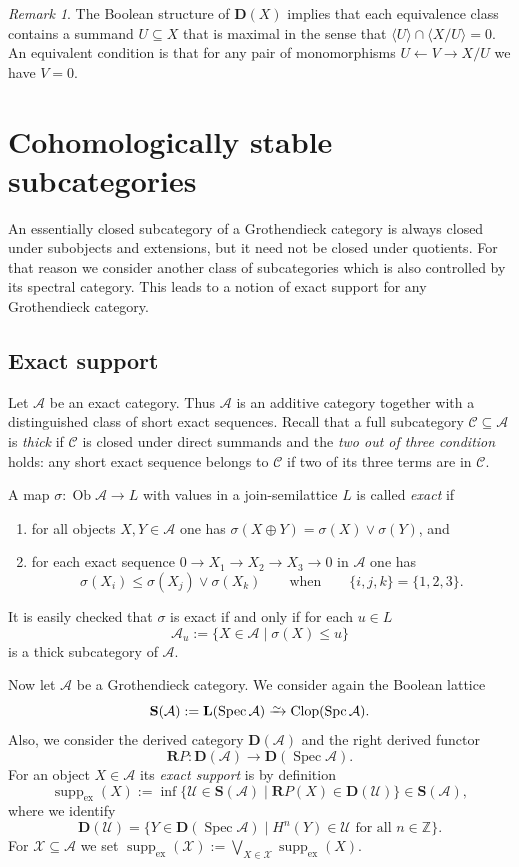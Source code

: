 \documentclass[a4paper]{amsart}
\theoremstyle{plain}
\theoremstyle{definition}
\theoremstyle{remark}
\newtheorem{rem}[thm]{Remark}
\numberwithin{equation}{section}
\newcommand{\Clop}{\operatorname{Clop}}
\newcommand{\Ob}{\operatorname{Ob}}
\newcommand{\Spc}{\operatorname{Spc}}
\newcommand{\Spec}{\operatorname{Spec}}
\newcommand{\suppex}{\operatorname{supp}_{\mathrm{ex}}}
\newcommand{\iso}{\xrightarrow{\raisebox{-.4ex}[0ex][0ex]{$\scriptstyle{\sim}$}}}
\newcommand{\lto}{\longrightarrow}
\def\A{\mathcal A}
\def\C{\mathcal C}
\def\U{\mathcal U}
\def\X{\mathcal X}
\def\bfD{\mathbf D}
\def\bfL{\mathbf L}
\def\bfR{\mathbf R}
\def\bfS{\mathbf S}
\def\bbZ{\mathbb Z}
\def\s{\sigma}
\begin{document}
\begin{rem}
  The Boolean structure of $\bfD(X)$ implies that each equivalence class
  contains a summand $U\subseteq X$ that is maximal in the sense that
  $\langle U\rangle\cap \langle X/U\rangle=0$. An equivalent condition
  is that for any pair of monomorphisms $U\leftarrow V\to X/U$ we have
  $V=0$.
\end{rem}


\section{Cohomologically stable subcategories}\label{se:coh-stable-sub}

An essentially closed subcategory of a Grothendieck category is always closed
under subobjects and extensions, but it need not be closed under
quotients.  For that reason we consider another class of subcategories
which is also controlled by its spectral category. This leads to a
notion of exact support for any Grothendieck category.

\subsection*{Exact support}

Let $\A$ be an exact category. Thus $\A$ is an additive category
together with a distinguished class of short exact sequences. Recall that
a full subcategory $\C\subseteq\A $  is \emph{thick} if $\C$
is closed under direct summands and the \emph{two out of three
  condition} holds: any short exact sequence belongs to $\C$ if two of
its three terms are in $\C$.

A map $\s\colon \Ob\A\to L$ with
values in a join-semilattice $L$ is called \emph{exact} if
\begin{enumerate}
  \item for all objects $X,Y\in\A$ one has $\s(X\oplus Y)=\s(X)\vee\s(Y)$, and
  \item for each exact sequence $0\to X_1\to X_2\to X_3\to 0$ in $\A$
    one has
    \[\s(X_i)\le\s(X_j)\vee\s(X_k)\qquad\text{when}\qquad\{i,j,k\}=\{1,2,3\}.\]
  \end{enumerate}
  It is easily checked that $\s$ is exact if and only if for each
  $u\in L$ \[\A_u:=\{X\in\A\mid\s(X)\le u\}\] is a thick subcategory of $\A$.

  Now let $\A$ be a Grothendieck category. We consider again the
  Boolean lattice
\[\bfS(\A):=\bfL(\Spec\A)\iso\Clop(\Spc\A).\] Also, we consider the derived
  category $\bfD(\A)$ and the right derived functor
\[\bfR P\colon\bfD(\A)\lto\bfD(\Spec\A).\]
For an object $X\in\A$ its \emph{exact support} is by definition
\begin{equation}\label{eq:suppex}
  \suppex(X):=\inf\{\U\in\bfS(\A)\mid \bfR
  P(X)\in\bfD(\U)\}\in\bfS(\A),
\end{equation}  
where we identify
\[\bfD(\U)=\{Y\in\bfD(\Spec\A)\mid  H^n(Y)\in\U\text{ for all }n\in\bbZ\}.\]
For $\X\subseteq\A$ we set $\suppex(\X):=\bigvee_{X\in\X}\suppex(X)$.
\end{document}
